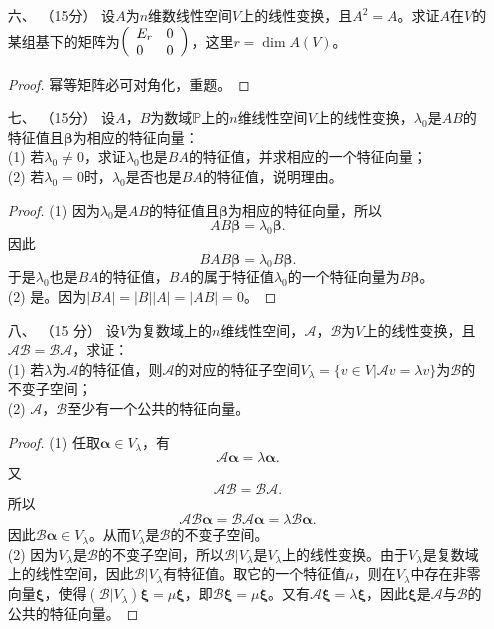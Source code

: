 \begin{enumerate}[1~]
\item[六、]（15分）
设$A$为$n$维数线性空间$V$上的线性变换，且$A^2=A$。求证$A$在$V$的某组基下的矩阵为$\left( \begin{array} { l l } { E _ { r } } & { 0 } \\ { 0 } & { 0 } \end{array} \right)$，这里$r = \operatorname { dim } A ( V )$。
\begin{proof}
幂等矩阵必可对角化，重题。
\end{proof}

\item[七、]（15分）
设$A$，$B$为数域$\mathbb{P}$上的$n$维线性空间$V$上的线性变换，$\lambda _ { 0 }$是$AB$的特征值且$\boldsymbol{\beta}$为相应的特征向量：\\
(1) 若$\lambda _ { 0 } \ne 0$，求证$\lambda _ { 0 }$也是$BA$的特征值，并求相应的一个特征向量；\\
(2) 若$\lambda _ { 0 } = 0$时，$\lambda _ { 0 }$是否也是$BA$的特征值，说明理由。
\begin{proof}
(1) 因为$\lambda _ { 0 }$是$AB$的特征值且$\boldsymbol{\beta}$为相应的特征向量，所以\[
AB\boldsymbol{\beta}=\lambda_0\boldsymbol{\beta}.
\]
因此\[
BAB\boldsymbol{\beta}=\lambda_0B\boldsymbol{\beta}.
\]
于是$\lambda _ { 0 }$也是$BA$的特征值，$BA$的属于特征值$\lambda_0$的一个特征向量为$B\boldsymbol{\beta}$。\\
(2) 是。因为$|BA|=|B||A|=|AB|=0$。
\end{proof}

\item[八、]（15 分）
设$V$为复数域上的$n$维线性空间，$\mathscr{A}$，$\mathscr{B}$为$V$上的线性变换，且$\mathscr{A}\mathscr{B}=\mathscr{B}\mathscr{A}$，求证：\\
(1) 若$\lambda$为$\mathscr{A}$的特征值，则$\mathscr{A}$的对应的特征子空间$V_{\lambda}=\{v\in V|\mathscr{A}v=\lambda v\}$为$\mathscr{B}$的不变子空间；\\
(2) $\mathscr{A}$，$\mathscr{B}$至少有一个公共的特征向量。
\begin{proof}
(1) 任取$\boldsymbol{\alpha}\in V_{\lambda}$，有\[
\mathscr{A}\boldsymbol{\alpha}=\lambda\boldsymbol{\alpha}.
\]
又\[
\mathscr{A}\mathscr{B}=\mathscr{B}\mathscr{A}.
\]
所以\[
\mathscr{A}\mathscr{B}\boldsymbol{\alpha}=\mathscr{B}\mathscr{A}\boldsymbol{\alpha}=\lambda \mathscr{B}\boldsymbol{\alpha}.
\]
因此$\mathscr{B}\boldsymbol{\alpha}\in V_{\lambda}$。从而$V_{\lambda}$是$\mathscr{B}$的不变子空间。\\
(2) 因为$V_{\lambda}$是$\mathscr{B}$的不变子空间，所以$\mathscr{B}|V_{\lambda}$是$V_{\lambda}$上的线性变换。由于$V_{\lambda}$是复数域上的线性空间，因此$\mathscr{B}|V_{\lambda}$有特征值。取它的一个特征值$\mu$，则在$V_{\lambda}$中存在非零向量$\boldsymbol{\xi}$，使得$(\mathscr{B}|V_{\lambda})\boldsymbol{\xi}=\mu\boldsymbol{\xi}$，即$\mathscr{B}\boldsymbol{\xi}=\mu\boldsymbol{\xi}$。又有$\mathscr{A}\boldsymbol{\xi}=\lambda\boldsymbol{\xi}$，因此$\boldsymbol{\xi}$是$\mathscr{A}$与$\mathscr{B}$的公共的特征向量。
\end{proof}


\end{enumerate}
